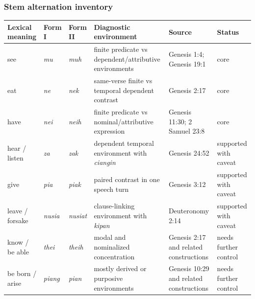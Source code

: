 \documentclass[
  11pt,
  a4paper,
]{article}
\newcounter{none} %
\newcommand{\tdim}[1]{\textit{#1}}
\begin{document}
\subsubsection{Stem alternation
inventory}\label{stem-alternation-inventory}

{\def\LTcaptype{none} %
\begin{longtable}[]{@{}
  >{\raggedright\arraybackslash}p{}
  >{\raggedright\arraybackslash}p{}
  >{\raggedright\arraybackslash}p{}
  >{\raggedright\arraybackslash}p{}
  >{\raggedright\arraybackslash}p{}
  >{\raggedright\arraybackslash}p{}@{}}
\toprule\noalign{}
\begin{minipage}[b]{\linewidth}\raggedright
Lexical meaning
\end{minipage} & \begin{minipage}[b]{\linewidth}\raggedright
Form I
\end{minipage} & \begin{minipage}[b]{\linewidth}\raggedright
Form II
\end{minipage} & \begin{minipage}[b]{\linewidth}\raggedright
Diagnostic environment
\end{minipage} & \begin{minipage}[b]{\linewidth}\raggedright
Source
\end{minipage} & \begin{minipage}[b]{\linewidth}\raggedright
Status
\end{minipage} \\
\midrule\noalign{}
\endhead
\bottomrule\noalign{}
\endlastfoot
see & \tdim{mu} & \tdim{muh} & finite predicate vs dependent/attributive
environments & Genesis 1:4; Genesis 19:1 & core \\
eat & \tdim{ne} & \tdim{nek} & same-verse finite vs temporal dependent
contrast & Genesis 2:17 & core \\
have & \tdim{nei} & \tdim{neih} & finite predicate vs
nominal/attributive expression & Genesis 11:30; 2 Samuel 23:8 & core \\
hear / listen & \tdim{za} & \tdim{zak} & dependent temporal environment
with \tdim{ciangin} & Genesis 24:52 & supported with caveat \\
give & \tdim{pia} & \tdim{piak} & paired contrast in one speech turn &
Genesis 3:12 & supported with caveat \\
leave / forsake & \tdim{nusia} & \tdim{nusiat} & clause-linking
environment with \tdim{kipan} & Deuteronomy 2:14 & supported with
caveat \\
know / be able & \tdim{thei} & \tdim{theih} & modal and nominalized
concentration & Genesis 2:17 and related constructions & needs further
control \\
be born / arise & \tdim{piang} & \tdim{pian} & mostly derived or
purposive environments & Genesis 10:29 and related constructions & needs
further control \\
\end{longtable}
}
\end{document}
